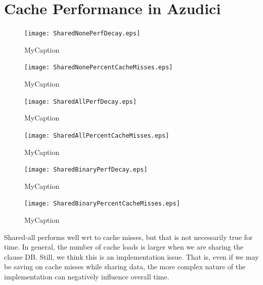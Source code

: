 \documentclass{llncs}
\begin{document}
\section{Cache Performance in Azudici}

\begin{minipage}[h]{.5\linewidth}
  \begin{figure}[htp]
    \centering
    \texttt{[image: SharedNonePerfDecay.eps]}
    \caption{MyCaption}
    \label{fig:MyLabel}
  \end{figure}
  \begin{figure}[htp]
    \centering
    \texttt{[image: SharedNonePercentCacheMisses.eps]}
    \caption{MyCaption}
    \label{fig:MyLabel}
  \end{figure}
\end{minipage}



\begin{minipage}[h]{.5\linewidth}
  \begin{figure}[htp]
    \centering
    \texttt{[image: SharedAllPerfDecay.eps]}
    \caption{MyCaption}
    \label{fig:MyLabel}
  \end{figure}
  \begin{figure}[htp]
    \centering
    \texttt{[image: SharedAllPercentCacheMisses.eps]}
    \caption{MyCaption}
    \label{fig:MyLabel}
  \end{figure}
\end{minipage}

\begin{minipage}[h]{.5\linewidth}
  \begin{figure}[htp]
    \centering
    \texttt{[image: SharedBinaryPerfDecay.eps]}
    \caption{MyCaption}
    \label{fig:MyLabel}
  \end{figure}
  \begin{figure}[htp]
    \centering
    \texttt{[image: SharedBinaryPercentCacheMisses.eps]}
    \caption{MyCaption}
    \label{fig:MyLabel}
  \end{figure}
\end{minipage}

Shared-all performs well wrt to cache misses, but that is not
necessarily true for time. In general, the number of cache loads is
larger when we are sharing the clause DB. Still, we think this is an
implementation issue. That is, even if we may be saving on cache
misses while sharing data, the more complex nature of the
implementation can negatively influence overall time.
\end{document}
